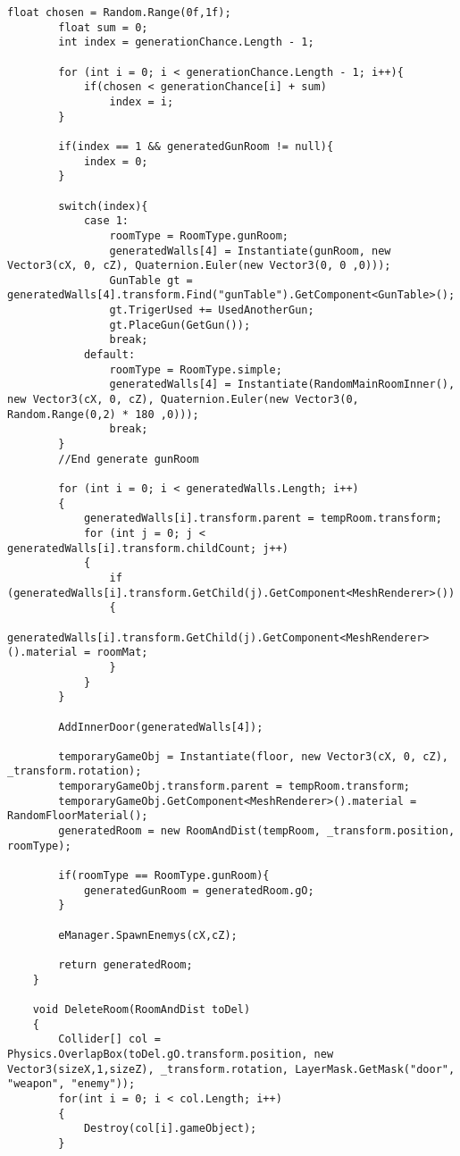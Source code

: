 \documentclass[14pt, titlepage,fleqn,a4paper]{extarticle}
\begin{document}
\begin{lstlisting}[caption= Генератор карты, label=lst:test]
        float chosen = Random.Range(0f,1f);
        float sum = 0;
        int index = generationChance.Length - 1;

        for (int i = 0; i < generationChance.Length - 1; i++){
            if(chosen < generationChance[i] + sum)
                index = i;
        }

        if(index == 1 && generatedGunRoom != null){
            index = 0;
        }

        switch(index){
            case 1:
                roomType = RoomType.gunRoom;
                generatedWalls[4] = Instantiate(gunRoom, new Vector3(cX, 0, cZ), Quaternion.Euler(new Vector3(0, 0 ,0)));
                GunTable gt =  generatedWalls[4].transform.Find("gunTable").GetComponent<GunTable>();
                gt.TrigerUsed += UsedAnotherGun;
                gt.PlaceGun(GetGun());
                break;
            default:
                roomType = RoomType.simple;
                generatedWalls[4] = Instantiate(RandomMainRoomInner(), new Vector3(cX, 0, cZ), Quaternion.Euler(new Vector3(0, Random.Range(0,2) * 180 ,0)));
                break;
        }
        //End generate gunRoom

        for (int i = 0; i < generatedWalls.Length; i++)
        {
            generatedWalls[i].transform.parent = tempRoom.transform;
            for (int j = 0; j < generatedWalls[i].transform.childCount; j++)
            {
                if (generatedWalls[i].transform.GetChild(j).GetComponent<MeshRenderer>())
                {
                    generatedWalls[i].transform.GetChild(j).GetComponent<MeshRenderer>().material = roomMat;
                }
            }
        }

        AddInnerDoor(generatedWalls[4]);

        temporaryGameObj = Instantiate(floor, new Vector3(cX, 0, cZ), _transform.rotation);
        temporaryGameObj.transform.parent = tempRoom.transform;
        temporaryGameObj.GetComponent<MeshRenderer>().material = RandomFloorMaterial();
        generatedRoom = new RoomAndDist(tempRoom, _transform.position, roomType);
        
        if(roomType == RoomType.gunRoom){
            generatedGunRoom = generatedRoom.gO;
        }

        eManager.SpawnEnemys(cX,cZ);
        
        return generatedRoom;
    }

    void DeleteRoom(RoomAndDist toDel)
    {
        Collider[] col = Physics.OverlapBox(toDel.gO.transform.position, new Vector3(sizeX,1,sizeZ), _transform.rotation, LayerMask.GetMask("door", "weapon", "enemy"));
        for(int i = 0; i < col.Length; i++)
        {
            Destroy(col[i].gameObject);
        }


\end{lstlisting}
\end{document}
